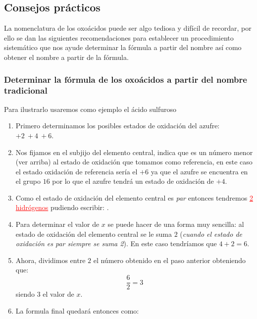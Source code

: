 \documentclass[11pt, a4paper]{article}
\begin{document}
\subsection{Consejos prácticos}

La nomenclatura de los oxoácidos puede ser algo tediosa y difícil de recordar, por ello se dan las siguientes recomendaciones para establecer un procedimiento sistemático que nos ayude determinar la fórmula a partir del nombre así como obtener el nombre a partir de la fórmula.

\subsubsection{Determinar la fórmula de los oxoácidos a partir del nombre tradicional}


Para ilustrarlo usaremos como ejemplo el ácido sulfuroso

\begin{enumerate}[label=\numberballgreen]
    \item Primero determinamos los posibles estados de oxidación del azufre: $+2\ +4\ +6$.
    \item Nos fijamos en el subjijo del elemento central,  indica que es un número menor (ver arriba) al estado de oxidación que tomamos como referencia, en este caso el estado oxidación de referencia sería el $+6$ ya que el azufre se encuentra en el grupo $16$ por lo que el azufre tendrá un estado de oxidación de $+4$.
    \item Como el estado de oxidación del elemento central es \textit{par} entonces tendremos \textcolor{red}{\uline{2 hidrógenos}} pudiendo escribir: .
    \item Para determinar el valor de $x$ se puede hacer de una forma muy sencilla: al estado de oxidación del elemento central se le suma $2$ (\textit{cuando el estado de oxidación es par siempre se suma 2}). En este caso tendríamos que $4 + 2 = 6$.
    \item Ahora, dividimos entre $2$ el número obtenido en el paso anterior obteniendo que:
          \[\frac{6}{2} = 3\]
          siendo $3$ el valor de $x$.
    \item La formula final quedará entonces como: 
\end{enumerate}

\end{document}
